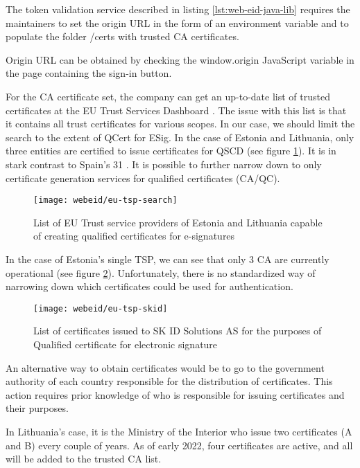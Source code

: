 The token validation service described in listing \ref{lst:web-eid-java-lib} requires the maintainers to set the origin URL in the form of an environment variable and to populate the folder {/certs} with trusted CA certificates.

Origin URL can be obtained by checking the {window.origin} JavaScript variable in the page containing the sign-in button.

For the CA certificate set, the company can get an up-to-date list of trusted certificates at the EU Trust Services Dashboard \cite{eu-trustservices}. The issue with this list is that it contains all trust certificates for various scopes. In our case, we should limit the search to the extent of QCert for ESig. In the case of Estonia and Lithuania, only three entities are certified to issue certificates for QSCD (see figure \ref{fig:eu-tsp-list}). It is in stark contrast to Spain's 31 \cite{eu-trustservices}. It is possible to further narrow down to only certificate generation services for qualified certificates (CA/QC).

\begin{figure}
  \centering
  \texttt{[image: webeid/eu-tsp-search]}
  \caption{List of EU Trust service providers of Estonia and Lithuania capable of creating qualified certificates for e-signatures}
  \label{fig:eu-tsp-list}
\end{figure}

In the case of Estonia's single TSP, we can see that only 3 CA are currently operational (see figure \ref{fig:eu-tsp-skid}). Unfortunately, there is no standardized way of narrowing down which certificates could be used for authentication.

\begin{figure}
  \centering
  \texttt{[image: webeid/eu-tsp-skid]}
  \caption{List of certificates issued to SK ID Solutions AS for the purposes of Qualified certificate for electronic signature}
  \label{fig:eu-tsp-skid}
\end{figure}

An alternative way to obtain certificates would be to go to the government authority of each country responsible for the distribution of certificates. This action requires prior knowledge of who is responsible for issuing certificates and their purposes.

In Lithuania's case, it is the Ministry of the Interior \cite{eid-lt-ministryofinterior-certificates} who issue two certificates (A and B) every couple of years. As of early 2022, four certificates are active, and all will be added to the trusted CA list.

